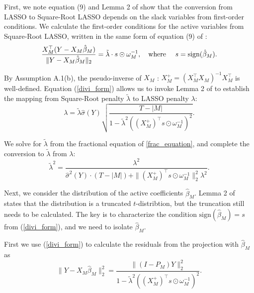 \documentclass[11pt]{article}
\newcommand{\q}{\text{\quad}}
\newcommand{\wh}{\text{where }}
\newcommand{\sgn}{\textrm{sign}}
\begin{document}
	First, we note equation (9) and Lemma 2 of \cite{tian2017selective} show that the conversion from LASSO to Square-Root LASSO depends on the slack variables from first-order conditions. We calculate the first-order conditions for the active variables from Square-Root LASSO, written in the same form of equation (9) of \cite{tian2017selective}:
	\begin{equation}\label{divi_form}
		\frac{X_M^\top (Y-X_M\hat{\beta}_M)}{\|Y-X_M\hat{\beta}_M\|_2}= \tilde{\lambda}\cdot s\odot\omega^{-1}_M,\q\wh\q s=\sgn(\hat{\beta}_M).
	\end{equation}

By Assumption A.1(b), the pseudo-inverse of $X_M$ : $X_M^+=(X_M^\top X_M)^{-1}X_M^\top$ is well-defined. Equation (\ref{divi_form}) allows us to invoke Lemma 2 of \cite{tian2017selective} to establish the mapping from Square-Root penalty $\tilde{\lambda}$ to LASSO penalty $\lambda$:
	\begin{equation}\label{frac_equation}
		\lambda = \tilde{\lambda}\hat{\sigma}(Y)\sqrt{\frac{T-|M|}{1-\tilde{\lambda}^2\left((X_M^+)^\top s\odot\omega^{-1}_M\right)^2}}.
	\end{equation}

	We solve for $\tilde{\lambda}$ from the fractional equation of \ref{frac_equation}, and complete the conversion to $\tilde{\lambda}$ from $\lambda$:
	\begin{equation}
		\tilde{\lambda}^2=\frac{\lambda^2}{\hat{\sigma}^2(Y)\cdot (T-|M|)+\|(X_M^+)^\top s\odot\omega^{-1}_M\|_2^2\lambda^2}.
	\end{equation}

	
	Next, we consider the distribution of the active coefficients $\hat{\beta}_M$. Lemma 2 of \cite{tian2017selective} states that the distribution is a truncated $t$-distribtion, but the truncation still needs to be calculated. The key is to characterize the condition $\sgn(\hat{\beta}_M)=s$ from (\ref{divi_form}), and we need to isolate $\hat{\beta}_M$. 
	
	First we use (\ref{divi_form}) to calculate the residuals from the projection with $\hat{\beta}_M$ as
	\begin{equation}
\|Y-X_M\hat{\beta}_M\|_2^2=\frac{\|(I-P_M)Y\|_2^2}{1-\tilde{\lambda}^2\left((X_M^+)^\top s\odot\omega^{-1}_M\right)^2}.
	\end{equation}
\end{document}
